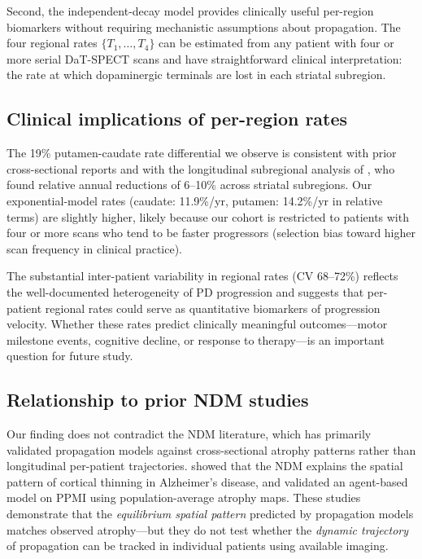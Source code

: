 Second, the independent-decay model provides clinically useful per-region biomarkers without requiring mechanistic assumptions about propagation. The four regional rates $\{T_1, \ldots, T_4\}$ can be estimated from any patient with four or more serial DaT-SPECT scans and have straightforward clinical interpretation: the rate at which dopaminergic terminals are lost in each striatal subregion.

\subsection{Clinical implications of per-region rates}

The 19\% putamen-caudate rate differential we observe is consistent with prior cross-sectional reports \cite{kish1988, brooks1990} and with the longitudinal subregional analysis of \cite{sung2016}, who found relative annual reductions of 6--10\% across striatal subregions. Our exponential-model rates (caudate: 11.9\%/yr, putamen: 14.2\%/yr in relative terms) are slightly higher, likely because our cohort is restricted to patients with four or more scans who tend to be faster progressors (selection bias toward higher scan frequency in clinical practice).

The substantial inter-patient variability in regional rates (CV 68--72\%) reflects the well-documented heterogeneity of PD progression \cite{simuni2024} and suggests that per-patient regional rates could serve as quantitative biomarkers of progression velocity. Whether these rates predict clinically meaningful outcomes---motor milestone events, cognitive decline, or response to therapy---is an important question for future study.

\subsection{Relationship to prior NDM studies}

Our finding does not contradict the NDM literature, which has primarily validated propagation models against cross-sectional atrophy patterns rather than longitudinal per-patient trajectories. \cite{raj2012} showed that the NDM explains the spatial pattern of cortical thinning in Alzheimer's disease, and \cite{abdelgawad2022} validated an agent-based model on PPMI using population-average atrophy maps. These studies demonstrate that the \textit{equilibrium spatial pattern} predicted by propagation models matches observed atrophy---but they do not test whether the \textit{dynamic trajectory} of propagation can be tracked in individual patients using available imaging.

